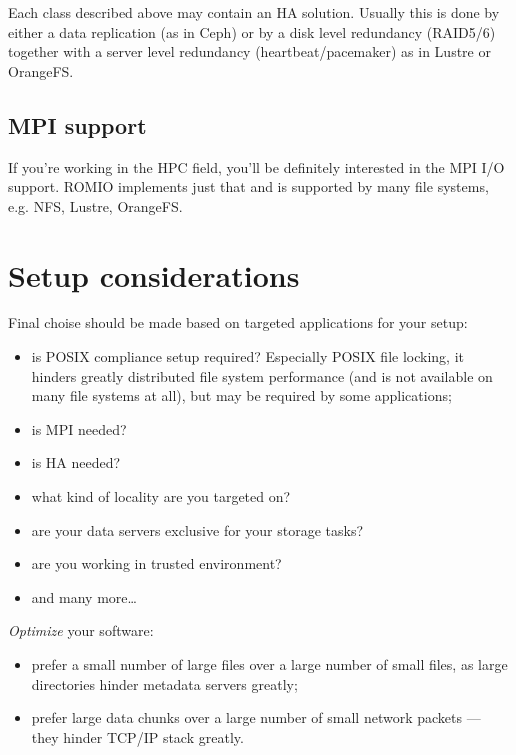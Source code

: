 \documentclass[10pt, a5paper]{article}
\begin{document}
Each class described above may contain an HA solution. Usually this is done by either a data replication (as in Ceph\cite{bib12}) or by a disk level redundancy (RAID5/6) together with a server level redundancy (heartbeat/pacemaker) as in Lustre\cite{bib10} or OrangeFS\cite{bib11}.

\subsection*{MPI support}

If you're working in the HPC\cite{bib9} field, you'll be definitely interested in the MPI\cite{bib13} I/O support. ROMIO\cite{bib14} implements just that and is supported by many file systems, e.g. NFS\cite{bib3}, Lustre\cite{bib10}, OrangeFS\cite{bib11}.

\section*{Setup considerations}

Final choise should be made based on targeted applications for your setup:

\begin{itemize}
  \item is POSIX compliance setup required? Especially POSIX file locking, it hinders greatly distributed file system performance (and is not available on many file systems at all), but may be required by some applications;
  \item is MPI\cite{bib13} needed?
  \item is HA needed?
  \item what kind of locality are you targeted on?
  \item are your data servers exclusive for your storage tasks?
  \item are you working in trusted environment?
  \item and many more\ldots{}
\end{itemize}

\emph{Optimize} your software:

\begin{itemize}
  \item prefer a small number of large files over a large number of small files, as large directories hinder metadata servers greatly;
  \item prefer large data chunks over a large number of small network packets — they hinder TCP/IP stack greatly.
\end{itemize}
\end{document}
